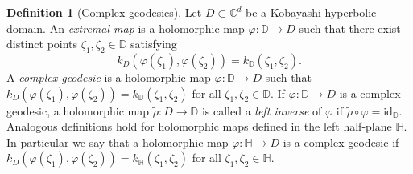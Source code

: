 \documentclass[11pt, reqno]{amsart}
\numberwithin{equation}{section}
\theoremstyle{definition}
\newtheorem{definition}[theorem]{Definition}
\newcommand{\C}{\mathbb{C}}
\newcommand{\D}{\mathbb{D}}
\newcommand{\id}{\mathrm{id}}
\renewcommand{\H}{\mathbb{H}}
\begin{document}
	\begin{definition}[Complex geodesics]\label{Cgeo}
		Let $D\subset \C^d$ be a Kobayashi hyperbolic domain. An {\sl extremal map} is a holomorphic map $\varphi\colon \D\to D$ 
		such that there exist distinct points  $\zeta_1,\zeta_2\in \D$ satisfying
		$$k_D(\varphi(\zeta_1),\varphi(\zeta_2))=k_\D(\zeta_1,\zeta_2).$$
		A {\sl complex geodesic} is a holomorphic map $\varphi\colon \D\to D$ such that $k_D(\varphi(\zeta_1),\varphi(\zeta_2))=k_\D(\zeta_1,\zeta_2)$ for all $\zeta_1,\zeta_2\in \D$.  
		If $\varphi\colon \D\to D$  is a complex geodesic, a holomorphic map $\tilde{\rho}\colon D\to\D$  is called a {\sl left inverse} of $\varphi$ if $\tilde \rho \circ\varphi=\id_\D.$ 
		Analogous definitions hold for holomorphic maps defined in the left half-plane $\H$. In particular we say that a holomorphic map $\varphi\colon \H\to D$ is a complex geodesic if  $k_D(\varphi(\zeta_1),\varphi(\zeta_2))=k_\H(\zeta_1,\zeta_2)$ for all $\zeta_1,\zeta_2\in \H$. 
	\end{definition}
	
\end{document}
